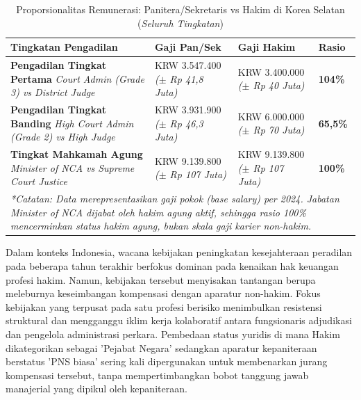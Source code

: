 \documentclass[12pt, a4paper]{article}
\begin{document}
\begin{table}[H]
\centering
\fontsize{10}{12}\selectfont
\caption{Proporsionalitas Remunerasi: Panitera/Sekretaris vs Hakim di Korea Selatan (\textit{Seluruh Tingkatan})}
\label{tab:komparasi-korsel}
\renewcommand{\arraystretch}{1.4}
\begin{tabular}{p{5.5cm} p{3.0cm} p{3.5cm} p{2.0cm}}
\hline
\textbf{Tingkatan Pengadilan} & \textbf{Gaji Pan/Sek} & \textbf{Gaji Hakim} & \textbf{Rasio} \tabularnewline
\hline
\raggedright\textbf{Pengadilan Tingkat Pertama} \newline \textit{Court Admin (Grade 3) vs District Judge} & \raggedright KRW 3.547.400 \newline \textit{($\pm$ Rp 41,8 Juta)} & \raggedright KRW 3.400.000 \newline \textit{($\pm$ Rp 40 Juta)} & \textbf{104\%} \tabularnewline
\raggedright\textbf{Pengadilan Tingkat Banding} \newline \textit{High Court Admin (Grade 2) vs High Judge} & \raggedright KRW 3.931.900 \newline \textit{($\pm$ Rp 46,3 Juta)} & \raggedright KRW 6.000.000 \newline \textit{($\pm$ Rp 70 Juta)} & \textbf{65,5\%} \tabularnewline
\raggedright\textbf{Tingkat Mahkamah Agung} \newline \textit{Minister of NCA vs Supreme Court Justice} & \raggedright KRW 9.139.800 \newline \textit{($\pm$ Rp 107 Juta)} & \raggedright KRW 9.139.800 \newline \textit{($\pm$ Rp 107 Juta)} & \textbf{100\%} \tabularnewline
\hline
\multicolumn{4}{p{14cm}}{\textit{*Catatan: Data merepresentasikan gaji pokok (base salary) per 2024. Jabatan Minister of NCA dijabat oleh hakim agung aktif, sehingga rasio 100\% mencerminkan status hakim agung, bukan skala gaji karier non-hakim.}} \tabularnewline
\end{tabular}
\end{table}

Dalam konteks Indonesia, wacana kebijakan peningkatan kesejahteraan peradilan pada beberapa tahun terakhir berfokus dominan pada kenaikan hak keuangan profesi hakim. Namun, kebijakan tersebut menyisakan tantangan berupa meleburnya keseimbangan kompensasi dengan aparatur non-hakim. Fokus kebijakan yang terpusat pada satu profesi berisiko menimbulkan resistensi struktural dan mengganggu iklim kerja kolaboratif antara fungsionaris adjudikasi dan pengelola administrasi perkara. Pembedaan status yuridis di mana Hakim dikategorikan sebagai 'Pejabat Negara' sedangkan aparatur kepaniteraan berstatus 'PNS biasa' sering kali dipergunakan untuk membenarkan jurang kompensasi tersebut, tanpa mempertimbangkan bobot tanggung jawab manajerial yang dipikul oleh kepaniteraan.
\end{document}
